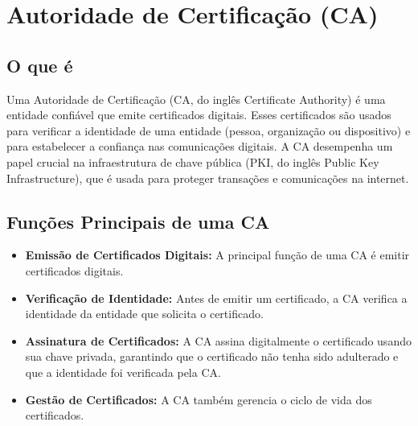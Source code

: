 \section{Autoridade de Certificação (CA)}

\subsection{O que é}

Uma Autoridade de Certificação (CA, do inglês Certificate Authority) é uma entidade confiável que emite certificados digitais. Esses certificados são usados para verificar a identidade de uma entidade (pessoa, organização ou dispositivo) e para estabelecer a confiança nas comunicações digitais. A CA desempenha um papel crucial na infraestrutura de chave pública (PKI, do inglês Public Key Infrastructure), que é usada para proteger transações e comunicações na internet.

\subsection{Funções Principais de uma CA}

\begin{itemize}
	\item \textbf{Emissão de Certificados Digitais: }A principal função de uma CA é emitir certificados digitais. 
	\item \textbf{Verificação de Identidade: }Antes de emitir um certificado, a CA verifica a identidade da entidade que solicita o certificado.
	\item \textbf{Assinatura de Certificados: }A CA assina digitalmente o certificado usando sua chave privada, garantindo que o certificado não tenha sido adulterado e que a identidade foi verificada pela CA.
	\item \textbf{Gestão de Certificados: }A CA também gerencia o ciclo de vida dos certificados.
\end{itemize}

\pagebreak
